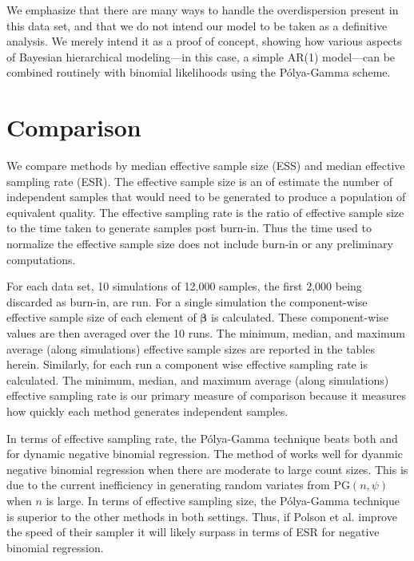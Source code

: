 \documentclass[11pt]{article}
\newcommand{\Polya}{P\'{o}lya}
\newcommand{\PG}{\text{PG}}
\newcommand{\bbeta}{\boldsymbol{\beta}}
\begin{document}
We emphasize that there are many ways to handle the overdispersion present in
this data set, and that we do not intend our model to be taken as a definitive
analysis.  We merely intend it as a proof of concept, showing how various
aspects of Bayesian hierarchical modeling---in this case, a simple AR(1)
model---can be combined routinely with binomial likelihoods using the
\Polya-Gamma scheme.

\section{Comparison}

We compare methods by median effective sample size (ESS) and median effective
sampling rate (ESR).  The effective sample size is an of estimate the number of
independent samples that would need to be generated to produce a population of
equivalent quality.  The effective sampling rate is the ratio of effective
sample size to the time taken to generate samples post burn-in.  Thus the time
used to normalize the effective sample size does not include burn-in or any
preliminary computations.

For each data set, 10 simulations of 12,000 samples, the first 2,000 being
discarded as burn-in, are run.  For a single simulation the component-wise
effective sample size of each element of $\bbeta$ is calculated.  These
component-wise values are then averaged over the 10 runs.  The minimum, median,
and maximum average (along simulations) effective sample sizes are reported in
the tables herein.  Similarly, for each run a component wise effective sampling
rate is calculated.  The minimum, median, and maximum average (along
simulations) effective sampling rate is our primary measure of comparison
because it measures how quickly each method generates independent samples.

In terms of effective sampling rate, the \Polya-Gamma technique beats both
\cite{ravines-etal-2006} and \cite{fussl-etal-2013} for dynamic negative
binomial regression.  The method of \cite{fruhwirth-schnatter-etal-2009} works
well for dyanmic negative binomial regression when there are moderate to large
count sizes.  This is due to the current inefficiency in generating random
variates from $\PG(n, \psi)$ when $n$ is large.  In terms of effective sampling
size, the \Polya-Gamma technique is superior to the other methods in both
settings.  Thus, if Polson et al. improve the speed of their sampler it will
likely surpass \cite{fussl-etal-2013} in terms of ESR for negative binomial
regression.
\end{document}
